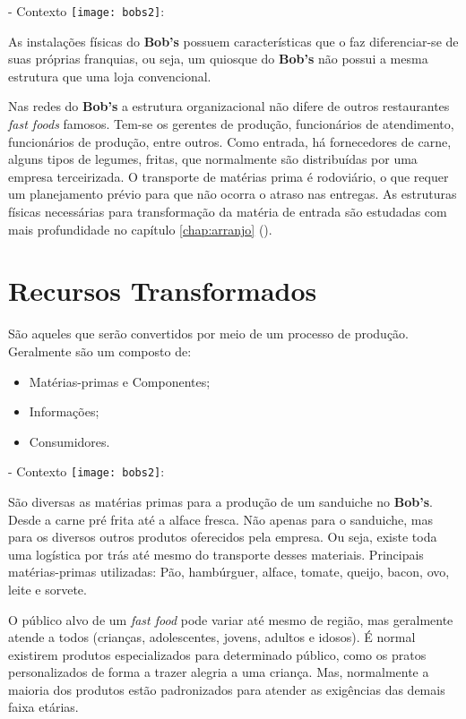 		- Contexto \texttt{[image: bobs2]}:

		As instalações físicas do \textbf{Bob’s} possuem características que o faz diferenciar-se de suas próprias franquias, ou seja, um quiosque do \textbf{Bob’s} não possui a mesma estrutura que uma loja convencional.
		
		Nas redes do \textbf{Bob’s} a estrutura organizacional não difere de outros restaurantes \emph{fast foods} famosos. Tem-se os gerentes de produção, funcionários de atendimento, funcionários de produção, entre outros. Como entrada, há fornecedores de carne, alguns tipos de legumes, fritas, que normalmente são distribuídas por uma empresa terceirizada. O transporte de matérias prima é rodoviário, o que requer um planejamento prévio para que não ocorra o atraso nas entregas. As estruturas físicas necessárias para transformação da matéria de entrada são estudadas com mais profundidade no capítulo \ref{chap:arranjo} ().


	\section[Recursos Transformados]{Recursos Transformados}
	\label{sec:dados_transformados}

		São aqueles que serão convertidos por meio de um processo de produção. Geralmente são um composto de: 

		\begin{itemize}
			\item{Matérias-primas e Componentes;}
			\item{Informações;}
			\item{Consumidores.}
		\end{itemize}
		
		- Contexto \texttt{[image: bobs2]}:

		São diversas as matérias primas para a produção de um sanduiche no \textbf{Bob’s}. Desde a carne pré frita até a alface fresca. Não apenas para o sanduiche, mas para os diversos outros produtos oferecidos pela empresa. Ou seja, existe toda uma logística por trás até mesmo do transporte desses materiais. Principais matérias-primas utilizadas: Pão, hambúrguer, alface, tomate, queijo, bacon, ovo, leite e sorvete.

		O público alvo de um \emph{fast food} pode variar até mesmo de região, mas geralmente atende a todos (crianças, adolescentes, jovens, adultos e idosos). É normal existirem produtos especializados para determinado público, como os pratos personalizados de forma a trazer alegria a uma criança. Mas, normalmente a maioria dos produtos estão padronizados para atender as exigências das demais faixa etárias.

